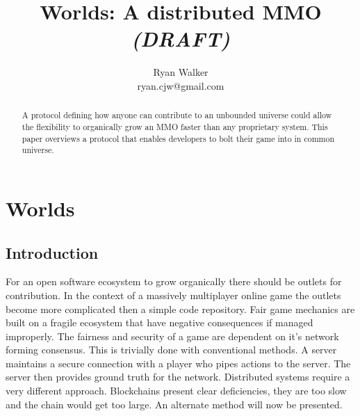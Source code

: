 \documentclass[runningheads,a4paper]{llncs}
\begin{document}
\def \SystemName {Worlds} %

\mainmatter  %

\title{\SystemName: A distributed MMO \textit{(DRAFT)}}

\author{Ryan Walker\\
				ryan.cjw@gmail.com}

\institute{} %

\maketitle

\begin{abstract}
A protocol defining how anyone can contribute to an unbounded universe could allow the flexibility to organically grow an MMO faster than any proprietary system. This paper overviews a protocol that enables developers to bolt their game into in common universe. 
\end{abstract}

\section{Worlds}
\subsection{Introduction}
For an open software ecosystem to grow organically there should be outlets for contribution. In the context of a massively multiplayer online game the outlets become more complicated then a simple code repository. Fair game mechanics are built on a fragile ecosystem that have negative consequences if managed improperly. The fairness and security of a game are dependent on it's network forming consensus. This is trivially done with conventional methods. A server maintains a secure connection with a player who pipes actions to the server. The server then provides ground truth for the network. Distributed systems require a very different approach. Blockchains present clear deficiencies, they are too slow and the chain would get too large. An alternate method will now be presented.
\end{document}
